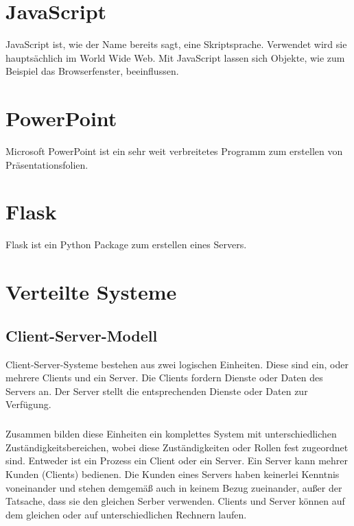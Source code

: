 \section{JavaScript}\label{sec:javascript}
JavaScript ist, wie der Name bereits sagt, eine Skriptsprache. Verwendet wird
sie hauptsächlich im World Wide Web. Mit JavaScript lassen sich Objekte, wie zum
Beispiel das Browserfenster, beeinflussen. \cite{Steyer2010}

\section{PowerPoint}\label{sec:powerpoint}
Microsoft PowerPoint ist ein sehr weit verbreitetes Programm zum erstellen von
Präsentationsfolien.


\section{Flask}\label{sec:flask}
Flask ist ein Python Package zum erstellen eines Servers.

\section{Verteilte Systeme}\label{sec:verteilte-systeme}

\subsection{Client-Server-Modell}\label{sec:client-server-modell}
Client-Server-Systeme bestehen aus zwei logischen Einheiten. Diese sind ein,
oder mehrere Clients und ein Server. Die Clients fordern Dienste oder Daten des
Servers an. Der Server stellt die entsprechenden Dienste oder Daten zur
Verfügung.

\subparagraph{}
Zusammen bilden diese Einheiten ein komplettes System mit unterschiedlichen
Zuständigkeitsbereichen, wobei diese Zuständigkeiten oder Rollen fest zugeordnet
sind. Entweder ist ein Prozess ein Client oder ein Server. Ein Server kann
mehrer Kunden (Clients) bedienen. Die Kunden eines Servers haben keinerlei
Kenntnis voneinander und stehen demgemäß auch in keinem Bezug zueinander, außer
der Tatsache, dass sie den gleichen Serber verwenden. Clients und Server können
auf dem gleichen oder auf unterschiedlichen Rechnern laufen.

